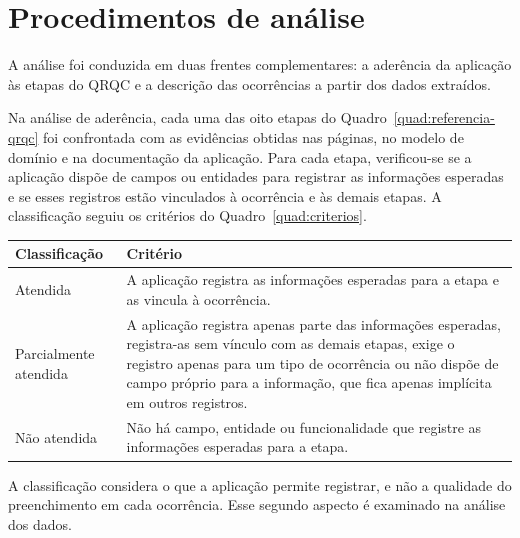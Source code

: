 \section{Procedimentos de análise}
\label{sec:analise}

A análise foi conduzida em duas frentes complementares: a aderência da aplicação às etapas do QRQC e a descrição das ocorrências a partir dos dados extraídos.

Na análise de aderência, cada uma das oito etapas do Quadro~\ref{quad:referencia-qrqc} foi confrontada com as evidências obtidas nas páginas, no modelo de domínio e na documentação da aplicação. Para cada etapa, verificou-se se a aplicação dispõe de campos ou entidades para registrar as informações esperadas e se esses registros estão vinculados à ocorrência e às demais etapas. A classificação seguiu os critérios do Quadro~\ref{quad:criterios}.

\begin{quadro}[htb]
    \centering
    \caption{Critérios de classificação da aderência às etapas do QRQC}
    \label{quad:criterios}
    \footnotesize
    \begin{tabularx}{\textwidth}{|>{\raggedright\arraybackslash}p{3.3cm}
                                    |>{\raggedright\arraybackslash}X|}
        \hline
        \textbf{Classificação} & \textbf{Critério} \\
        \hline
        Atendida & A aplicação registra as informações esperadas para a etapa e as vincula à ocorrência. \\
        \hline
        Parcialmente atendida & A aplicação registra apenas parte das informações esperadas, registra-as sem vínculo com as demais etapas, exige o registro apenas para um tipo de ocorrência ou não dispõe de campo próprio para a informação, que fica apenas implícita em outros registros. \\
        \hline
        Não atendida & Não há campo, entidade ou funcionalidade que registre as informações esperadas para a etapa. \\
        \hline
    \end{tabularx}
\end{quadro}

A classificação considera o que a aplicação permite registrar, e não a qualidade do preenchimento em cada ocorrência. Esse segundo aspecto é examinado na análise dos dados.

